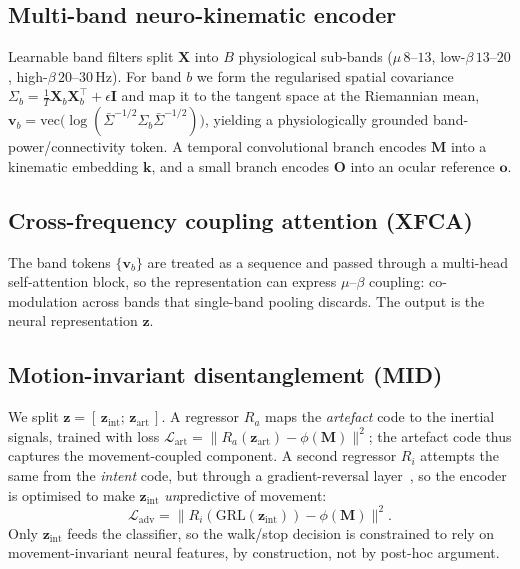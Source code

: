 \documentclass[conference]{IEEEtran}
\begin{document}
\subsection{Multi-band neuro-kinematic encoder}
Learnable band filters split $\mathbf{X}$ into $B$ physiological sub-bands
($\mu\,8$--$13$, low-$\beta\,13$--$20$, high-$\beta\,20$--$30$\,Hz). For band $b$ we
form the regularised spatial covariance
$\Sigma_b = \tfrac{1}{T}\mathbf{X}_b\mathbf{X}_b^{\!\top} + \epsilon\mathbf{I}$ and map
it to the tangent space at the Riemannian mean,
$\mathbf{v}_b=\mathrm{vec}\!\big(\log(\bar\Sigma^{-1/2}\Sigma_b\bar\Sigma^{-1/2})\big)$,
yielding a physiologically grounded band-power/connectivity token. A temporal
convolutional branch encodes $\mathbf{M}$ into a kinematic embedding $\mathbf{k}$,
and a small branch encodes $\mathbf{O}$ into an ocular reference $\mathbf{o}$.

\subsection{Cross-frequency coupling attention (XFCA)}
The band tokens $\{\mathbf{v}_b\}$ are treated as a sequence and passed through a
multi-head self-attention block, so the representation can express $\mu$--$\beta$
coupling: co-modulation across bands that single-band pooling discards. The output
is the neural representation $\mathbf{z}$.

\subsection{Motion-invariant disentanglement (MID)}
We split $\mathbf{z}=[\,\mathbf{z}_{\mathrm{int}};\,\mathbf{z}_{\mathrm{art}}\,]$. A
regressor $R_a$ maps the \emph{artefact} code to the inertial signals, trained with
loss $\mathcal{L}_{\mathrm{art}}=\lVert R_a(\mathbf{z}_{\mathrm{art}})-\phi(\mathbf{M})\rVert^2$;
the artefact code thus captures the movement-coupled component. A second regressor
$R_i$ attempts the same from the \emph{intent} code, but through a gradient-reversal
layer~\cite{ganin2016}, so the encoder is optimised to make $\mathbf{z}_{\mathrm{int}}$
\emph{un}predictive of movement:
\begin{equation}
\mathcal{L}_{\mathrm{adv}}=\lVert R_i(\mathrm{GRL}(\mathbf{z}_{\mathrm{int}}))-\phi(\mathbf{M})\rVert^2 .
\end{equation}
Only $\mathbf{z}_{\mathrm{int}}$ feeds the classifier, so the walk/stop decision is
constrained to rely on movement-invariant neural features, by construction, not by
post-hoc argument.
\end{document}
